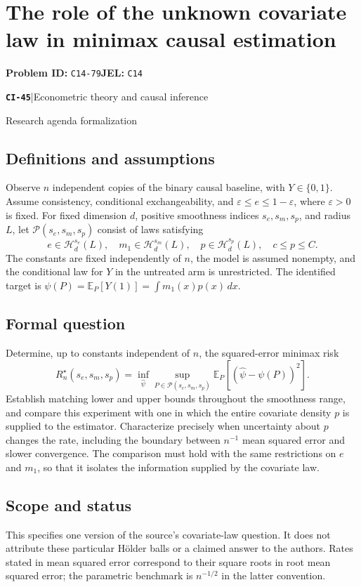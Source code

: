 \documentclass[11pt,a4paper]{article}
\newcommand{\E}{\mathbb E}
\newcommand{\entrymeta}[3]{{\sffamily\small\color{muted}\textbf{\texttt{#1}}\quad|\quad #2\par #3\par}}
\begin{document}
\section*{The role of the unknown covariate law in minimax causal estimation}
\textbf{Problem ID:} \texttt{C14-79}\quad \textbf{JEL:} \texttt{C14}\par
\label{problem:OP-0524}
\label{beyond:CI-45}
\entrymeta{CI-45}{Econometric theory and causal inference}{Research agenda formalization}
\subsection*{Definitions and assumptions}
Observe $n$ independent copies of the binary causal baseline, with $Y\in\{0,1\}$. Assume consistency, conditional exchangeability, and $\varepsilon\leq e\leq1-\varepsilon$, where $\varepsilon>0$ is fixed. For fixed dimension $d$, positive smoothness indices $s_e,s_m,s_p$, and radius $L$, let $\mathcal P(s_e,s_m,s_p)$ consist of laws satisfying
\[
 e\in\mathcal H_d^{s_e}(L),\quad
 m_1\in\mathcal H_d^{s_m}(L),\quad
 p\in\mathcal H_d^{s_p}(L),\quad c\leq p\leq C.
\]
The constants are fixed independently of $n$, the model is assumed nonempty, and the conditional law for $Y$ in the untreated arm is unrestricted. The identified target is $\psi(P)=\E_P[Y(1)]=\int m_1(x)p(x)\,dx$.
\subsection*{Formal question}
Determine, up to constants independent of $n$, the squared-error minimax risk
\[
 R_n^\star(s_e,s_m,s_p)
 =\inf_{\widehat\psi}\sup_{P\in\mathcal P(s_e,s_m,s_p)}
 \E_P[(\widehat\psi-\psi(P))^2].
\]
Establish matching lower and upper bounds throughout the smoothness range, and compare this experiment with one in which the entire covariate density $p$ is supplied to the estimator. Characterize precisely when uncertainty about $p$ changes the rate, including the boundary between $n^{-1}$ mean squared error and slower convergence. The comparison must hold with the same restrictions on $e$ and $m_1$, so that it isolates the information supplied by the covariate law.
\subsection*{Scope and status}
This specifies one version of the source's covariate-law question. It does not attribute these particular Hölder balls or a claimed answer to the authors. Rates stated in mean squared error correspond to their square roots in root mean squared error; the parametric benchmark is $n^{-1/2}$ in the latter convention.
\end{document}
